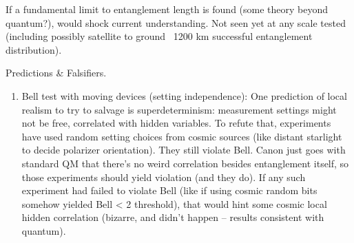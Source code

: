 \documentclass[11pt]{article}
\begin{document}
\begin{itemize}
If a fundamental limit to entanglement length is found (some theory beyond quantum?), would shock current understanding. Not seen yet at any scale tested (including possibly satellite to ground ~1200 km successful entanglement distribution).




\end{itemize}

Predictions & Falsifiers.


\begin{enumerate}

\item 
Bell test with moving devices (setting independence): One prediction of local realism to try to salvage is superdeterminism: measurement settings might not be free, correlated with hidden variables. To refute that, experiments have used random setting choices from cosmic sources (like distant starlight to decide polarizer orientation). They still violate Bell. Canon just goes with standard QM that there’s no weird correlation besides entanglement itself, so those experiments should yield violation (and they do). If any such experiment had failed to violate Bell (like if using cosmic random bits somehow yielded Bell < 2 threshold), that would hint some cosmic local hidden correlation (bizarre, and didn't happen – results consistent with quantum).




\end{enumerate}
\end{document}
